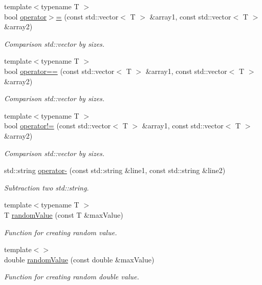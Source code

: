 \begin{DoxyCompactItemize}
{\footnotesize template$<$typename T $>$ }\\bool \mbox{\hyperlink{namespaceofo_aeff44072bd4fb8ed491c94e7eb4c2059}{operator$>$=}} (const std\+::vector$<$ T $>$ \&array1, const std\+::vector$<$ T $>$ \&array2)
\begin{DoxyCompactList}\small\item\em Comparison std\+::vector by sizes. \end{DoxyCompactList}\item 
{\footnotesize template$<$typename T $>$ }\\bool \mbox{\hyperlink{namespaceofo_ac9b79c838072eb36ce92e234b0b4dc81}{operator==}} (const std\+::vector$<$ T $>$ \&array1, const std\+::vector$<$ T $>$ \&array2)
\begin{DoxyCompactList}\small\item\em Comparison std\+::vector by sizes. \end{DoxyCompactList}\item 
{\footnotesize template$<$typename T $>$ }\\bool \mbox{\hyperlink{namespaceofo_a9746f36ff374ab6299fb0f990e0e0e83}{operator!=}} (const std\+::vector$<$ T $>$ \&array1, const std\+::vector$<$ T $>$ \&array2)
\begin{DoxyCompactList}\small\item\em Comparison std\+::vector by sizes. \end{DoxyCompactList}\item 
std\+::string \mbox{\hyperlink{namespaceofo_ab410ed9a84e65ca88a937b56b8411a97}{operator-\/}} (const std\+::string \&line1, const std\+::string \&line2)
\begin{DoxyCompactList}\small\item\em Subtraction two std\+::string. \end{DoxyCompactList}\item 
{\footnotesize template$<$typename T $>$ }\\T \mbox{\hyperlink{namespaceofo_afe5c86df101d1623b1aea71e3ba7b0a9}{random\+Value}} (const T \&max\+Value)
\begin{DoxyCompactList}\small\item\em Function for creating random value. \end{DoxyCompactList}\item 
{\footnotesize template$<$$>$ }\\double \mbox{\hyperlink{namespaceofo_a159780949b5de21d2d8358df8abc0ce2}{random\+Value}} (const double \&max\+Value)
\begin{DoxyCompactList}\small\item\em Function for creating random double value. \end{DoxyCompactList}\item 

\end{DoxyCompactItemize}
